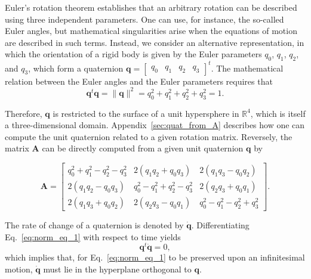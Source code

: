 \documentclass[aip,jcp,reprint,amsmath,amssymb,amsfont]{revtex4-1}
\newcommand{\mt}[1]{\boldsymbol{\mathbf{#1}}}           %
\newcommand{\vt}[1]{\boldsymbol{\mathbf{#1}}}           %
\newcommand{\tr}[1]{#1^t}                               %
\begin{document}
Euler's rotation theorem establishes that an arbitrary rotation can be described using three independent parameters. One can use, for instance, the so-called Euler angles, but mathematical singularities arise when the equations of motion are described in such terms. Instead, we consider an alternative representation, in which the orientation of a rigid body is given by the Euler parameters $q_0$, $q_1$, $q_2$, and $q_3$, which form a quaternion $\vt q = \tr {[\begin{array}{cccc} q_0 & q_1 & q_2 & q_3 \end{array}]}$. The mathematical relation between the Euler angles and the Euler parameters requires that\cite{Goldstein2002}
\begin{equation}
\label{eq:norm_eq_1}
\tr{\vt q}{\vt q} = \|\vt q\|^2 = q_0^2 + q_1^2 + q_2^2 + q_3^2 = 1.
\end{equation}

Therefore, $\vt q$ is restricted to the surface of a unit hypersphere in $\mathbb{R}^4$, which is itself a three-dimensional domain. Appendix~\ref{sec:quat_from_A} describes how one can compute the unit quaternion related to a given rotation matrix. Reversely, the matrix $\mt A$ can be directly computed from a given unit quaternion $\vt q$ by\cite{Allen1989,Miller2002}
\begin{widetext}
\begin{equation}
\label{eq:A_from_q}
\mt A = \left[ \begin{array}{ccc}
q_0^2 + q_1^2 - q_2^2 - q_3^2 & 2(q_1 q_2 + q_0 q_3) & 2(q_1 q_3 - q_0 q_2) \\
2(q_1 q_2 - q_0 q_3) & q_0^2 - q_1^2 + q_2^2 - q_3^2 & 2(q_2 q_3 + q_0 q_1) \\
2(q_1 q_3 + q_0 q_2) & 2(q_2 q_3 - q_0 q_1) & q_0^2 - q_1^2 - q_2^2 + q_3^2  
\end{array} \right].
\end{equation}
\end{widetext}

The rate of change of a quaternion is denoted by $\dot{\vt q}$. Differentiating Eq.~\ref{eq:norm_eq_1} with respect to time yields
\begin{equation}
\label{eq:diff_qTq}
\tr{\vt q}\dot{\vt q} = 0,
\end{equation}
which implies that, for Eq.~\ref{eq:norm_eq_1} to be preserved upon an infinitesimal motion, $\dot{\vt q}$ must lie in the hyperplane orthogonal to $\vt q$.
\end{document}
